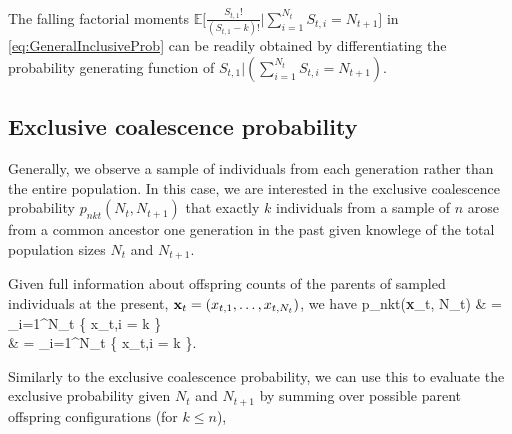 \documentclass{article}
\let\oldalign\align
\let\oldendalign\endalign
\renewenvironment{align}{\linenomathNonumbers\oldalign}{\oldendalign\endlinenomath}
\begin{document}
The falling factorial moments $\mathbb{E} \big[ \frac{S_{t,1}!}{(S_{t,1} - k)!} \big | \sum_{i=1}^{N_t} S_{t,i} = N_{t+1} \big]$ in \eqref{eq:GeneralInclusiveProb} can be readily obtained by differentiating the probability generating function of $S_{t,1} | (\sum_{i=1}^{N_t} S_{t,i} = N_{t+1})$.

\subsection{Exclusive coalescence probability}

Generally, we observe a sample of individuals from each generation rather than the entire population.
In this case, we are interested in the exclusive coalescence probability $p_{nkt}(N_t, N_{t+1})$ that exactly $k$ individuals from a sample of $n$ arose from a common ancestor one generation in the past given knowlege of the total population sizes $N_t$ and $N_{t+1}$.

Given full information about offspring counts of the parents of sampled individuals at the present, ${\bf x}_t = (x_{t,1}, \dots, x_{t,N_t})$, we have
	\begin{align}
		p_{nkt}({\bf x}_t, N_t)
			& = \sum_{i=1}^{N_t}   \{ x_{t,i} = k \}\nonumber\\
			& = \sum_{i=1}^{N_t}    \{ x_{t,i} = k \}.
	\end{align}

Similarly to the exclusive coalescence probability, we can use this to evaluate the exclusive probability given $N_t$ and $N_{t+1}$ by summing over possible parent offspring configurations (for $k \leq n$),
\end{document}
